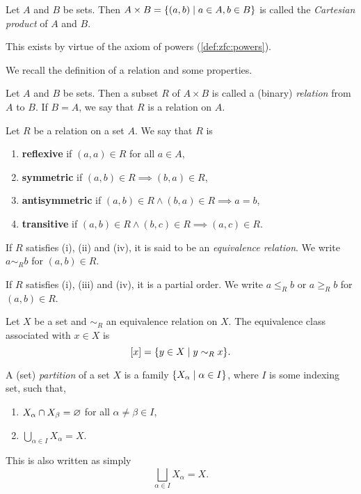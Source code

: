 
\begin{definition} \label{def:cartesian_product}
    Let $A$ and $B$ be sets.
    Then $A \times B = \set{(a, b) \mid a \in A, b \in B}$ is called the
    \emph{Cartesian product} of $A$ and $B$. 
\end{definition}
This exists by virtue of the axiom of powers (\ref{def:zfc:powers}).

We recall the definition of a relation and some properties.
\begin{definition}[Relation] \label{def:relation}
    Let $A$ and $B$ be sets.
    Then a subset $R$ of $A \times B$ is called a (binary) \emph{relation}
    from $A$ to $B$.
    If $B = A$, we say that $R$ is a relation on $A$.
\end{definition}
\begin{definition*}
    Let $R$ be a relation on a set $A$.
    We say that $R$ is
    \begin{enumerate}
        \item \textbf{reflexive} if $(a, a) \in R$ for all $a \in A$,
        \item \textbf{symmetric} if $(a, b) \in R \implies (b, a) \in R$,
        \item \textbf{antisymmetric} if $(a, b) \in R \land (b, a) \in R
        \implies a = b$,
        \item \textbf{transitive} if $(a, b) \in R \land (b, c) \in R
        \implies (a, c) \in R$.
    \end{enumerate}
    If $R$ satisfies (i), (ii) and (iv), it is said to be an
    \emph{equivalence relation}.
    We write $a \sim_R b$ for $(a, b) \in R$.

    If $R$ satisfies (i), (iii) and (iv), it is a partial order.
    We write $a \le_R b$ or $a \ge_R b$ for $(a, b) \in R$.
\end{definition*}

\begin{definition} \label{def:equivalence_class}
    Let $X$ be a set and $\sim_R$ an equivalence relation on $X$.
    The equivalence class associated with $x \in X$ is \[
        [x] = \set{y \in X \mid y \sim_R x}.
    \]
\end{definition}

\begin{definition}[Partition] \label{def:partition}
    A (set) \emph{partition} of a set $X$ is a family $\set{X_\alpha \mid
    \alpha \in I}$, where $I$ is some indexing set, such that,
    \begin{enumerate}
        \item $X_\alpha \cap X_\beta = \varnothing$ for all $\alpha \ne \beta \in I$,
        \item $\bigcup_{\alpha \in I} X_\alpha = X$.
    \end{enumerate}
    This is also written as simply \[
        \bigsqcup_{\alpha \in I} X_\alpha = X.
    \]
\end{definition}

